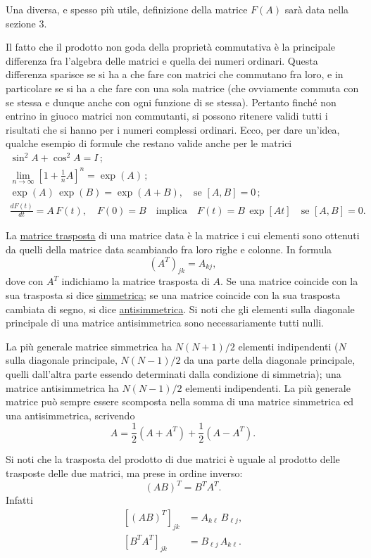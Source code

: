 \documentclass[11pt, a4paper]{book}
\numberwithin{equation}{section}
\begin{document}
Una diversa, e spesso più utile, definizione della matrice $F(A)$ sarà data nella sezione 3.

Il fatto che il prodotto non goda della proprietà commutativa è la principale differenza fra l'algebra delle matrici e quella dei numeri ordinari. Questa differenza sparisce se si ha a che fare con matrici che commutano fra loro, e in particolare se si ha a che fare con una sola matrice (che ovviamente commuta con se stessa e dunque anche con ogni funzione di se stessa). Pertanto finché non entrino in giuoco matrici non commutanti, si possono ritenere validi tutti i risultati che si hanno per i numeri complessi ordinari. Ecco, per dare un'idea, qualche esempio di formule che restano valide anche per le matrici
\begin{gather*}
    \sin^2 A + \cos^2 A = I\,; \\
    \lim_{n \to \infty} \left[1 + \tfrac{1}{n} A\right]^n = \exp(A)\,; \\
    \exp(A)\,\exp(B) = \exp(A+B), \quad \text{se } [A,B] = 0\,; \\
    \frac{dF(t)}{dt} = A\,F(t),\quad F(0) = B \quad \text{implica} \quad
    F(t) = B\,\exp[At] \quad \text{se } [A, B] = 0.
\end{gather*}

La \underline{matrice trasposta} di una matrice data è la matrice i cui elementi sono ottenuti da quelli della matrice data scambiando fra loro righe e colonne. In formula
\begin{equation}
    \left(A^T\right)_{jk} = A_{kj},
    \tag{22}
\end{equation}
dove con $A^T$ indichiamo la matrice trasposta di $A$. Se una matrice coincide con la sua trasposta si dice \underline{simmetrica}; se una matrice coincide con la sua trasposta cambiata di segno, si dice \underline{antisimmetrica}. Si noti che gli elementi sulla diagonale principale di una matrice antisimmetrica sono necessariamente tutti nulli.

La più generale matrice simmetrica ha $N(N+1)/2$ elementi indipendenti ($N$ sulla diagonale principale, $N(N-1)/2$ da una parte della diagonale principale, quelli dall'altra parte essendo determinati dalla condizione di simmetria); una matrice antisimmetrica ha $N(N-1)/2$ elementi indipendenti. La più generale matrice può sempre essere scomposta nella somma di una matrice simmetrica ed una antisimmetrica, scrivendo
\[
    A = \frac{1}{2}\left(A + A^T\right) + \frac{1}{2}\left(A - A^T\right).
\]

Si noti che la trasposta del prodotto di due matrici è uguale al prodotto delle trasposte delle due matrici, ma prese in ordine inverso:
\begin{equation}
    (AB)^T = B^T A^T.
    \tag{23}
\end{equation}
Infatti
\begin{align}
    \left[(AB)^T\right]_{jk} &= A_{k\ell}\, B_{\ell j},
    \tag{24a} \\
    \left[B^T A^T\right]_{jk} &= B_{\ell j}\, A_{k\ell}.
    \tag{24b}
\end{align}
\end{document}
